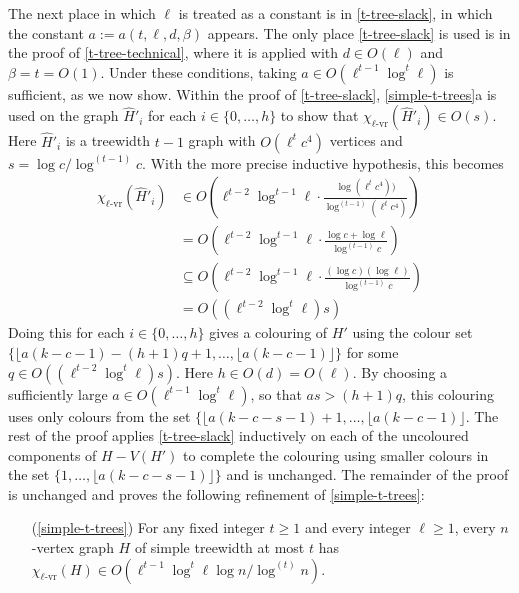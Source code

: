 \documentclass[kpfonts]{patmorin}
\newcommand{\rn}[1]{\chi_{\operatorname{#1-vr}}}
\newcommand{\lrn}{\rn{\ell}}
\theoremstyle{named}
\newcommand{\weirdref}[2]{\cref{#1}#2}
\begin{document}
The next place in which $\ell$ is treated as a constant is in \cref{t-tree-slack}, in which the constant $a:=a(t,\ell,d,\beta)$ appears.  The only place \cref{t-tree-slack} is used is in the proof of \cref{t-tree-technical}, where it is applied with $d\in O(\ell)$ and $\beta=t=O(1)$.  Under these conditions, taking $a\in O(\ell^{t-1}\log^t \ell)$ is sufficient, as we now show. Within the proof of \cref{t-tree-slack}, \weirdref{simple-t-trees}{a} is used on the graph $\hat{H}'_i$ for each $i\in\{0,\ldots,h\}$ to show that $\lrn(\hat{H}'_i)\in O(s)$.  Here $\hat{H}'_i$ is a treewidth $t-1$ graph with $O(\ell^t c^4)$ vertices and $s=\log c/\log^{(t-1)} c$.  With the more precise inductive hypothesis, this becomes
\begin{align*}
    \lrn(\hat{H}'_i) & \in O\left(\ell^{t-2}\log^{t-1}\ell
    \cdot \frac{\log (\ell^{t} c^4))}{\log^{(t-1)} (\ell^t c^4)}\right) \\
    & = O\left(\ell^{t-2}\log^{t-1}\ell\cdot \frac{\log c + \log\ell}{\log^{(t-1)} c}\right) \\
    & \subseteq O\left(\ell^{t-2}\log^{t-1}\ell\cdot \frac{(\log c)(\log\ell)}{\log^{(t-1)} c}\right) \\
    & = O((\ell^{t-2}\log^t\ell)s)
\end{align*}
Doing this for each $i\in\{0,\ldots,h\}$ gives a colouring of $H'$ using the colour set $\{\lfloor a(k-c-1)-(h+1)q+1,\ldots,\lfloor a(k-c-1)\rfloor\}$ for some $q\in O((\ell^{t-2}\log^t\ell)s)$.  Here $h\in O(d)=O(\ell)$. By choosing a sufficiently large $a\in O(\ell^{t-1}\log^t\ell)$, so that $as > (h+1)q$, this colouring uses only colours from the set $\{\lfloor a(k-c-s-1)+1,\ldots,\lfloor a(k-c-1)\rfloor$.  The rest of the proof applies \cref{t-tree-slack} inductively on each of the uncoloured components of $H-V(H')$ to complete the colouring using smaller colours in the set $\{1,\ldots,\lfloor a(k-c-s-1)\rfloor\}$ and is unchanged.  The remainder of the proof is unchanged and proves the following refinement of \cref{simple-t-trees}:

\begin{itemize}
    \item[(\ref{simple-t-trees})] For any fixed integer $t\ge 1$ and every integer $\ell\ge 1$, every $n$-vertex graph $H$ of simple treewidth at most $t$ has $\lrn(H)\in O(\ell^{t-1}\log^t \ell\log n/\log^{(t)} n)$.
\end{itemize}
\end{document}
